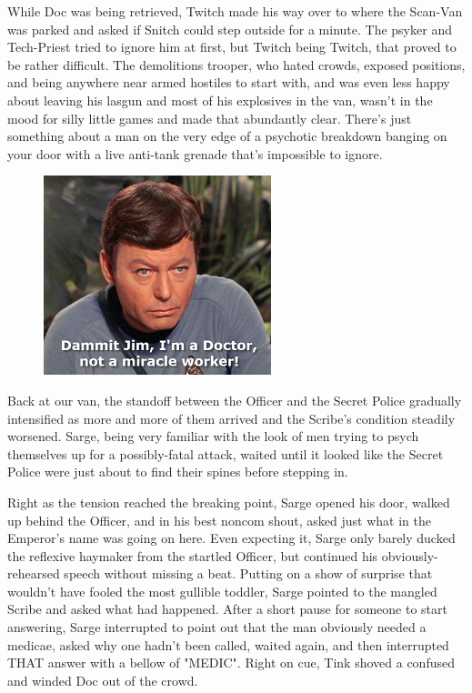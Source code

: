 While Doc was being retrieved, Twitch made his way over to where the Scan-Van was parked and asked if Snitch could step outside for a minute. 
The psyker and Tech-Priest tried to ignore him at first, but Twitch being Twitch, that proved to be rather difficult. 
The demolitions trooper, who hated crowds, exposed positions, and being anywhere near armed hostiles to start with, and was even less happy about leaving his lasgun and most of his explosives in the van, wasn't in the mood for silly little games and made that abundantly clear. 
There's just something about a man on the very edge of a psychotic breakdown banging on your door with a live anti-tank grenade that's impossible to ignore.

\begin{figure}
	\begin{center}
		\includegraphics[width=\figwidth]{pics/17/50.png}
	\end{center}
\end{figure}
Back at our van, the standoff between the Officer and the Secret Police gradually intensified as more and more of them arrived and the Scribe's condition steadily worsened. 
Sarge, being very familiar with the look of men trying to psych themselves up for a possibly-fatal attack, waited until it looked like the Secret Police were just about to find their spines before stepping in.

Right as the tension reached the breaking point, Sarge opened his door, walked up behind the Officer, and in his best noncom shout, asked just what in the Emperor's name was going on here. 
Even expecting it, Sarge only barely ducked the reflexive haymaker from the startled Officer, but continued his obviously-rehearsed speech without missing a beat. 
Putting on a show of surprise that wouldn't have fooled the most gullible toddler, Sarge pointed to the mangled Scribe and asked what had happened. 
After a short pause for someone to start answering, Sarge interrupted to point out that the man obviously needed a medicae, asked why one hadn't been called, waited again, and then interrupted THAT answer with a bellow of "MEDIC". 
Right on cue, Tink shoved a confused and winded Doc out of the crowd.

